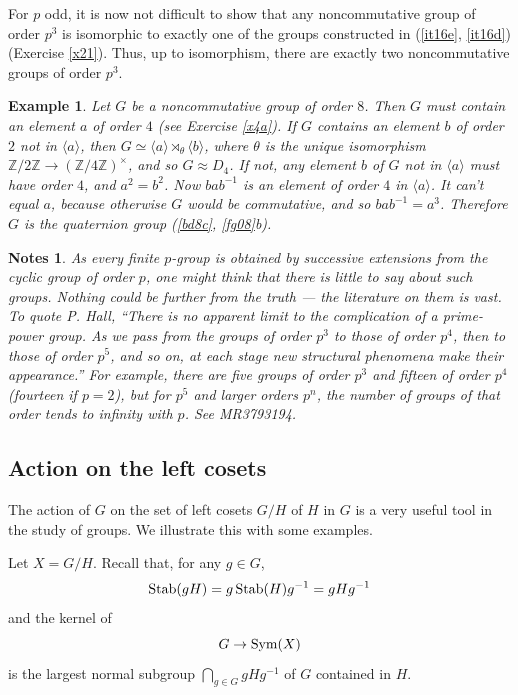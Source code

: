 \documentclass[a4paper,11pt,final,openany]{memoir}%
\newtheorem{example}[X]{Example}
\newtheorem*{nt}{Notes}
\theoremstyle{nonumberplain}
\begin{document}
For $p$ odd, it is now not difficult to show that any noncommutative group of
order $p^{3}$ is isomorphic to exactly one of the groups constructed in
(\ref{it16e}, \ref{it16d}) (Exercise \ref{x21}). Thus, up to isomorphism,
there are exactly two noncommutative groups of order $p^{3}$.

\begin{example}
\label{ga18e}Let $G$ be a noncommutative group of order $8$. Then $G$ must
contain an element $a$ of order $4$ (see Exercise \ref{x4a}). If $G$ contains
an element $b$ of order $2$ not in $\langle a\rangle$, then $G\simeq\langle
a\rangle\rtimes_{\theta}\langle b\rangle$, where $\theta$ is the unique
isomorphism $\mathbb{Z}{}/2\mathbb{Z}{}\rightarrow(\mathbb{Z}{}/4\mathbb{Z}%
{})^{\times}$, and so $G\approx D_{4}$. If not, any element $b$ of $G$ not in
$\langle a\rangle$ must have order $4$, and $a^{2}=b^{2}$. Now $bab^{-1}$ is
an element of order $4$ in $\langle a\rangle$. It can't equal $a$, because
otherwise $G$ would be commutative, and so $bab^{-1}=a^{3}$. Therefore $G$ is
the quaternion group (\ref{bd8c}, \ref{fg08}b).
\end{example}

\begin{nt}
As every finite $p$-group is obtained by successive extensions from the cyclic
group of order $p$, one might think that there is little to say about such
groups. Nothing could be further from the truth --- the literature on them is
vast. To quote P. Hall, ``There is no apparent limit to the complication of a
prime-power group. As we pass from the groups of order $p^{3}$ to those of
order $p^{4}$, then to those of order $p^{5}$, and so on, at each stage new
structural phenomena make their appearance.'' For example, there are five
groups of order $p^{3}$ and fifteen of order $p^{4}$ (fourteen if $p=2$), but
for $p^{5}$ and larger orders $p^{n}$, the number of groups of that order
tends to infinity with $p$. See MR3793194.
\end{nt}

\subsection{Action on the left cosets}

The action of $G$ on the set of left cosets $G/H$ of $H$ in $G$ is a very
useful tool in the study of groups. We illustrate this with some examples.

Let $X=G/H$. Recall that, for any $g\in G$,
\[
\Stab(gH)=g\Stab(H)g^{-1}=gHg^{-1}%
\]
and the kernel of
\[
G\rightarrow\operatorname{Sym}(X)
\]
is the largest normal subgroup $\bigcap_{g\in G}gHg^{-1}$ of $G$ contained in
$H$.
\end{document}
